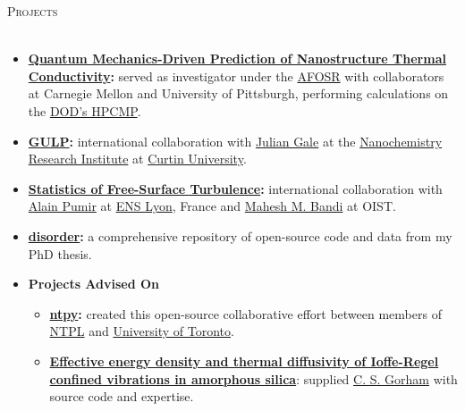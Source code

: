 \documentclass{article}
\newcommand{\lineunder}{\vspace*{-8pt} \\ \hspace*{-18pt} \hrulefill \\}
\newcommand{\header}[1]{{\hspace*{-15pt}\vspace*{6pt} \textsc{#1}} \vspace*{-6pt} \lineunder}
\newenvironment{achievements}{\begin{list}{$\bullet$}{\topsep 0pt \itemsep -2pt}}{\vspace*{4pt}\end{list}}
\begin{document}
\header{Projects}
\begin{itemize}[leftmargin=*]

\item \textbf{\href{http://ntpl.me.cmu.edu/research.html}{Quantum Mechanics-Driven Prediction of Nanostructure Thermal Conductivity}:}
served as investigator under the 
\href{http://www.wpafb.af.mil/afrl/afosr/}{AFOSR} with collaborators at Carnegie Mellon and University of Pittsburgh, performing 
calculations on the \href{http://www.hpcmo.hpc.mil/cms2/index.php}{DOD's HPCMP}.

\item \textbf{\href{https://nanochemistry.curtin.edu.au/local/docs/gulp/gulp4.2_manual.pdf}{GULP}:} international collaboration with \href{http://nanochemistry.curtin.edu.au/people/staff.cfm/J.Gale}{Julian Gale} at the 
\href{http://nanochemistry.curtin.edu.au/}{Nanochemistry Research Institute} at \href{http://www.curtin.edu.au/}{Curtin University}.

\item \textbf{\href{http://jasonlarkin.github.io/projects-ms.html}{Statistics of Free-Surface Turbulence}:} international collaboration with \href{http://perso.ens-lyon.fr/alain.pumir/Pumir_webpage.html}{Alain Pumir} at \href{http://www.ens-lyon.eu/annuaire/m-pumir-alain-83656.kjsp?RH=ZYZYZYZYZYZYZYZYZYZYZY}{ENS Lyon}, France and \href{https://groups.oist.jp/ciu/mahesh-m-bandi}{Mahesh M. Bandi} at OIST.  

  \item \textbf{\href{https://github.com/jasonlarkin/disorder}{disorder}:} a comprehensive repository of open-source code and data from my PhD thesis.

\item \textbf{Projects Advised On}
\begin{itemize}

  \item \textbf{\href{https://github.com/ntpl/ntpy}{ntpy}:} created this open-source  collaborative effort between members of \href{http://ntpl.me.cmu.edu/}{NTPL} and \href{http://www.mie.utoronto.ca/labs/atoms/}{University of Toronto}.

  \item \textbf{\href{http://www.andrew.cmu.edu/user/caroling/publications.html}{Effective energy density and thermal diffusivity of Ioffe-Regel confined vibrations in amorphous silica}}: supplied \href{http://www.andrew.cmu.edu/user/caroling/}{C. S. Gorham} with source code and expertise. 


\end{itemize}
\end{itemize}
\end{document}
